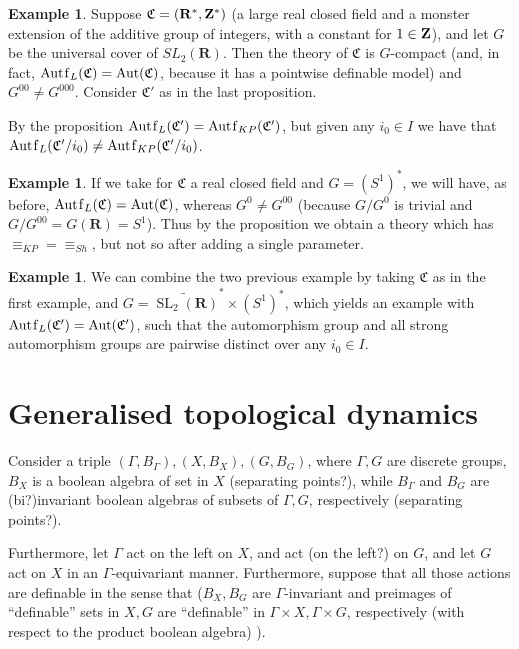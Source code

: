\documentclass[final,a4paper,12pt]{amsart}
\newcommand{\fC}{{\mathfrak C}}
\newcommand{\bR}{{\mathbf{R}}}
\DeclareMathOperator{\Aut}{{Aut}}
\DeclareMathOperator{\Autf}{{Aut\mkern 0.5\thinmuskip f}}
\DeclareMathOperator{\SL}{{SL}}
\theoremstyle{remark}
\theoremstyle{definition}
\newtheorem{ex}[thm]{Example}
\let\Gamma\varGamma
\begin{document}
	\begin{ex}
		Suppose $\fC=({\bR}^*,{\bf Z}^*)$ (a large real closed field and a monster extension of the additive group of integers, with a constant for $1\in {\bf Z}$), and let $G$ be the universal cover of $SL_2({\bR})$. Then the theory of $\fC$ is $G$-compact (and, in fact, $\Autf_L(\fC)=\Aut(\fC)$, because it has a pointwise definable model)  and  $G^{00}\neq G^{000}$. Consider $\fC'$ as in the last proposition.
		
		By the proposition $\Autf_L(\fC')=\Autf_{KP}(\fC')$, but given any $i_0\in I$ we have that $\Autf_L(\fC'/i_0)\neq \Autf_{KP}(\fC'/i_0)$.
	\end{ex}
	
	\begin{ex}
		If we take for $\fC$ a real closed field and $G=(S^1)^*$, we will have, as before, $\Autf_L(\fC)=\Aut(\fC)$, whereas $G^0\neq G^{00}$ (because $G/G^0$ is trivial and $G/G^{00}=G({\bR})=S^1$). Thus by the proposition we obtain a theory which has ${\equiv_{KP}}={\equiv_{Sh}}$, but not so after adding a single parameter.
	\end{ex}
	
	\begin{ex}
		We can combine the two previous example by taking $\fC$ as in the first example, and $G=\widetilde{\SL_2({\bR})}^*\times (S^1)^*$, which yields an example with $\Autf_L(\fC')=\Aut(\fC')$, such that the automorphism group and all strong automorphism groups are pairwise distinct over any $i_0\in I$.
	\end{ex}
	
	\section{Generalised topological dynamics}
	Consider a triple $(\Gamma,B_\Gamma),(X,B_X),(G,B_G)$, where $\Gamma,G$ are discrete groups, $B_X$ is a boolean algebra of set in $X$ (separating points?), while $B_\Gamma$ and $B_G$ are (bi?)invariant boolean algebras of subsets of $\Gamma,G$, respectively (separating points?).
	
	Furthermore, let $\Gamma$ act on the left on $X$, and act (on the left?) on $G$, and let $G$ act on $X$ in an $\Gamma$-equivariant manner. Furthermore, suppose that all those actions are definable in the sense that ($B_X,B_G$ are $\Gamma$-invariant and preimages of ``definable'' sets in $X,G$ are ``definable'' in $\Gamma\times X,\Gamma\times G$, respectively (with respect to the product boolean algebra) ).
	
\end{document}

